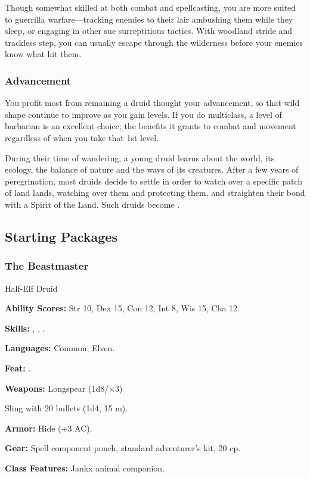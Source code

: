 Though somewhat skilled at both combat and spellcasting, you are more suited to guerrilla warfare---tracking enemies to their lair ambushing them while they sleep, or engaging in other sue surreptitious tactics. With woodland stride and trackless step, you can usually escape through the wilderness before your enemies know what hit them.

\subsubsection{Advancement}

You profit most from remaining a druid thought your advancement, so that %
wild shape continue to improve as you gain levels. If you do multiclass, a level of barbarian is an excellent choice; the benefits it grants to combat and movement regardless of when you take that 1st level.

During their time of wandering, a young druid learns about the world, its ecology, the balance of nature and the ways of its creatures. After a few years of peregrination, most druids decide to settle in order to watch over a specific patch of land lands, watching over them and protecting them, and straighten their bond with a Spirit of the Land. Such druids become .

\subsection{Starting Packages}
\subsubsection{The Beastmaster}

Half-Elf Druid

\textbf{Ability Scores:} Str 10, Dex 15, Con 12, Int 8, Wis 15, Cha 12.

\textbf{Skills:} , , .

\textbf{Languages:} Common, Elven.

\textbf{Feat:} .

\textbf{Weapons:} Longspear (1d8/$\times$3)

Sling with 20 bullets (1d4, 15 m).

\textbf{Armor:} Hide (+3 AC).

\textbf{Gear:} Spell component pouch, standard adventurer's kit, 20 cp.

\textbf{Class Features:} Jankx animal companion.


